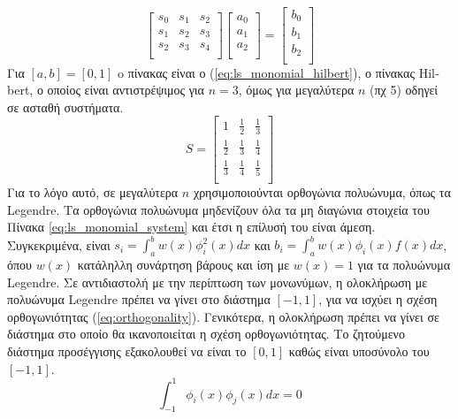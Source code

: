 \documentclass[assignment3.tex]{subfiles}
\begin{document}
\begin{equation}
\left[
\begin{matrix}
s_0 & s_1 & s_2 \\
s_1 & s_2 & s_3 \\
s_2 & s_3 & s_4 \\
\end{matrix}
\right]
\left[
\begin{matrix}
a_0 \\
a_1 \\
a_2 \\
\end{matrix}
\right]=
\left[
\begin{matrix}
b_0 \\
b_1 \\
b_2 \\
\end{matrix}
\right]
\label{eq:ls_monomial_system}
\end{equation}
Για $[a,b]=[0,1]$ o πίνακας είναι ο (\ref{eq:ls_monomial_hilbert}), ο πίνακας \textlatin{Hilbert}, ο οποίος είναι αντιστρέψιμος για $n=3$, όμως για μεγαλύτερα $n$ (πχ 5) οδηγεί σε ασταθή συστήματα.
\begin{equation}
S=\left[
\begin{matrix}
1 & \frac{1}{2} & \frac{1}{3} \\
\frac{1}{2} & \frac{1}{3} & \frac{1}{4} \\
\frac{1}{3} & \frac{1}{4} & \frac{1}{5} \\
\end{matrix}
\right]
\label{eq:ls_monomial_hilbert}
\end{equation}
Για το λόγο αυτό, σε μεγαλύτερα $n$ χρησιμοποιούνται ορθογώνια πολυώνυμα, όπως τα \textlatin{Legendre}. Τα ορθογώνια πολυώνυμα μηδενίζουν όλα τα μη διαγώνια στοιχεία του Πίνακα \ref{eq:ls_monomial_system} και έτσι η επίλυσή του είναι άμεση.
Συγκεκριμένα, είναι $s_i = \int_{a}^{b}w(x)\phi_i^2(x)dx$ και $b_i=\int_{a}^{b}w(x)\phi_i(x) f(x)dx$, όπου $w(x)$ κατάληλλη συνάρτηση βάρους και ίση με $w(x)=1$ για τα πολυώνυμα \textlatin{Legendre}. Σε αντιδιαστολή με την περίπτωση των μονωνύμων, η ολοκλήρωση με πολυώνυμα \textlatin{Legendre} πρέπει να γίνει στο διάστημα $[-1,1]$, για να ισχύει η σχέση ορθογωνιότητας (\ref{eq:orthogonality}). Γενικότερα, η ολοκλήρωση πρέπει να γίνει σε διάστημα στο οποίο θα ικανοποιείται η σχέση ορθογωνιότητας. Το ζητούμενο διάστημα προσέγγισης εξακολουθεί να είναι το $[0,1]$ καθώς είναι υποσύνολο του $[-1,1]$.
\begin{equation}
\int_{-1}^{1}\phi_i(x)\phi_j(x)dx=0
\label{eq:orthogonality}
\end{equation}
\end{document}
